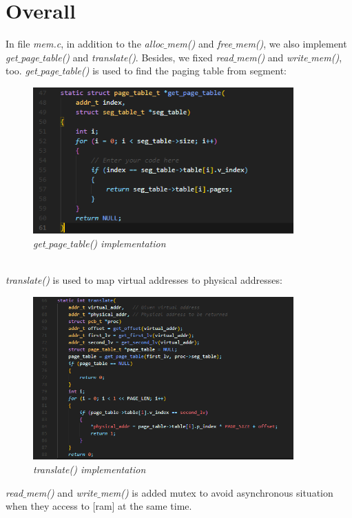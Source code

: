 \documentclass[13pt,a4paper]{article}
\begin{document}
	\section{Overall}
			In file \textit{mem.c}, in addition to the \textit{alloc$\_$mem()} and \textit{free$\_$mem()}, we also implement \textit{get$\_$page$\_$table()} and \textit{translate()}. Besides, we fixed \textit{read$\_$mem()} and \textit{write$\_$mem()}, too.\newpage
			\textit{get$\_$page$\_$table()} is used to find the paging table from segment: \\
			\begin{figure}[h!]
				\begin{center}
					\includegraphics[width=10cm]{get_page.png}
					\caption{\textit{get$\_$page$\_$table() implementation}}
				\end{center}
			\end{figure} \\
			\textit{translate()} is used to map virtual addresses to physical addresses: \\
			\begin{figure}[h!]
				\begin{center}
					\includegraphics[width=10cm]{translate.png}
					\caption{\textit{translate() implementation}}
				\end{center}
			\end{figure} \newpage
			\textit{read$\_$mem()} and \textit{write$\_$mem()} is added mutex to avoid asynchronous situation when they access to [ram] at the same time.
\end{document}
